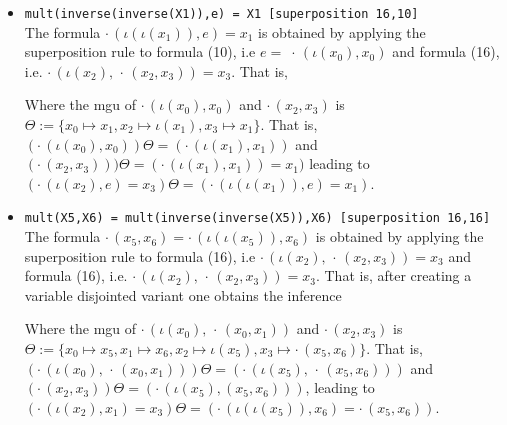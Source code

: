 \documentclass[11pt,a4paper]{article}
\begin{document}
\begin{itemize}
\item \texttt{mult(inverse(inverse(X1)),e) = X1 [superposition 16,10]}\\
The formula $\cdot \,(\iota(\iota(x_1)),e)=x_1$ is obtained by applying the superposition rule to formula (10), i.e $e =\;\cdot\,(\iota(x_0), x_0)$ and formula (16), i.e. $\cdot \, (\iota(x_2), \, \cdot \, (x_2, x_3))=x_3$. That is, 
\begin{prooftree}
\end{prooftree}
Where the mgu of $\cdot\,(\iota(x_0), x_0)$ and $\cdot \, (x_2, x_3)$ is $\Theta := \{x_0 \mapsto x_1, x_2 \mapsto \iota(x_1), x_3 \mapsto x_1\}$.
That is, $(\cdot\,(\iota(x_0), x_0))\Theta = (\cdot\,(\iota(x_1), x_1))$ and $(\cdot \, (x_2, x_3)))\Theta = (\cdot \, (\iota(x_1), x_1))=x_1)$ leading to $(\cdot \,(\iota(x_2),e)=x_3)\Theta = (\cdot \,(\iota(\iota(x_1)),e)=x_1)$.




\item \texttt{mult(X5,X6) = mult(inverse(inverse(X5)),X6) [superposition 16,16]}\\
The formula $\cdot \,(x_5, x_6) = \cdot \, (\iota(\iota(x_5)),x_6)$ is obtained by applying the superposition rule to formula (16), i.e $\cdot \, (\iota(x_2), \, \cdot \, (x_2, x_3))=x_3$ and formula (16), i.e. $\cdot \, (\iota(x_2), \, \cdot \, (x_2, x_3))=x_3$. That is,  after creating a variable disjointed variant one obtains the inference
\begin{prooftree}
\end{prooftree}
Where the mgu of $\cdot \, (\iota(x_0), \, \cdot \, (x_0, x_1))$ and $\cdot \, (x_2, x_3)$ is $\Theta := \{x_0 \mapsto x_5 , x_1 \mapsto x_6, x_2 \mapsto \iota(x_5), x_3 \mapsto \cdot \, (x_5, x_6) \}$. That is, $(\cdot \, (\iota(x_0), \, \cdot \, (x_0, x_1)))\Theta = (\cdot \, (\iota(x_5), \, \cdot \, (x_5, x_6)))$ and $(\cdot \, (x_2, x_3))\Theta = (\cdot \, (\iota(x_5), (x_5, x_6) ))$, leading to $(\cdot \, (\iota(x_2), x_1)=x_3) \Theta = (\cdot \, (\iota(\iota(x_5)), x_6)=\cdot \, (x_5, x_6))$.


\end{itemize}
\end{document}
